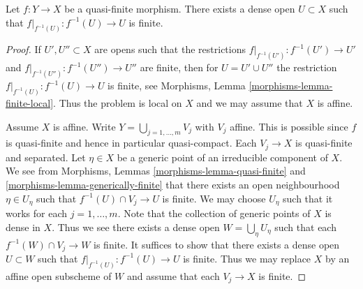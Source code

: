 \begin{lemma}
\label{lemma-quasi-finite-finite-over-dense-open}
Let $f : Y \to X$ be a quasi-finite morphism.
There exists a dense open $U \subset X$ such that
$f|_{f^{-1}(U)} : f^{-1}(U) \to U$ is finite.
\end{lemma}

\begin{proof}
If $U', U'' \subset X$ are opens such that the restrictions
$f|_{f^{-1}(U')} : f^{-1}(U') \to U'$ and
$f|_{f^{-1}(U'')} : f^{-1}(U'') \to U''$ are finite,
then for $U = U' \cup U''$ the restriction $f|_{f^{-1}(U)} : f^{-1}(U) \to U$
is finite, see
Morphisms, Lemma \ref{morphisms-lemma-finite-local}.
Thus the problem is local on $X$ and we may assume that $X$ is affine.

\medskip\noindent
Assume $X$ is affine.
Write $Y = \bigcup_{j = 1, \ldots, m} V_j$ with $V_j$ affine.
This is possible since $f$ is quasi-finite and hence
in particular quasi-compact. Each $V_j \to X$ is quasi-finite
and separated. Let $\eta \in X$ be a generic point of an irreducible
component of $X$. We see from
Morphisms, Lemmas
\ref{morphisms-lemma-quasi-finite} and \ref{morphisms-lemma-generically-finite}
that there exists an open neighbourhood $\eta \in U_\eta$ such that
$f^{-1}(U) \cap V_j \to U$ is finite. We may choose $U_\eta$ such
that it works for each $j = 1, \ldots, m$.
Note that the collection of generic points of $X$ is dense in $X$.
Thus we see there exists a dense open $W = \bigcup_\eta U_\eta$
such that each $f^{-1}(W) \cap V_j \to W$ is finite.
It suffices to show that there exists a dense open $U \subset W$
such that $f|_{f^{-1}(U)} : f^{-1}(U) \to U$ is finite.
Thus we may replace $X$ by an affine open subscheme of $W$ and
assume that each $V_j \to X$ is finite.


\end{proof}
